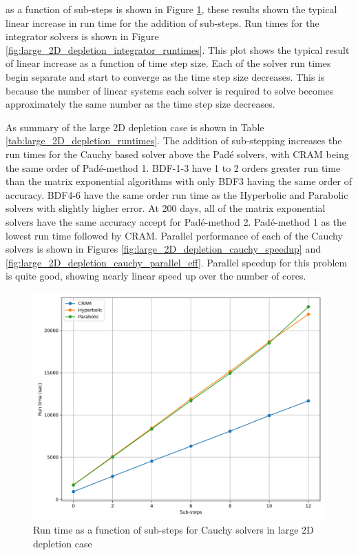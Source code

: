 \clearpage

\noindent as a function of sub-steps is shown in Figure \ref{fig:large_2D_depletion_Cauchy_runtimes}, these results shown the typical linear increase in run time for the addition of sub-steps. Run times for the integrator solvers is shown in Figure \ref{fig:large_2D_depletion_integrator_runtimes}. This plot shows the typical result of linear increase as a function of time step size. Each of the solver run times begin separate and start to converge as the time step size decreases. This is because the number of linear systems each solver is required to solve becomes approximately the same number as the time step size decreases. 

As summary of the large 2D depletion case is shown in Table \ref{tab:large_2D_depletion_runtimes}. The addition of sub-stepping increases the run times for the Cauchy based solver above the Pad\'e solvers, with CRAM being the same order of Pad\'e-method 1. BDF-1-3 have 1 to 2 orders greater run time than the matrix exponential algorithms with only BDF3 having the same order of accuracy. BDF4-6 have the same order run time as the Hyperbolic and Parabolic solvers with slightly higher error. At 200 days, all of the matrix exponential solvers have the same accuracy accept for Pad\'e-method 2. Pad\'e-method 1 as the lowest run time followed by CRAM. Parallel performance of each of the Cauchy solvers is shown in Figures \ref{fig:large_2D_depletion_cauchy_speedup} and \ref{fig:large_2D_depletion_cauchy_parallel_eff}. Parallel speedup for this problem is quite good, showing nearly linear speed up over the number of cores. 

\clearpage

\begin{figure}[p]
    \centering
    \includegraphics[width=5in]{images/chapter-5/caseStudies/large2DDepletion/msr2DDepletionLargeCauchyRuntimes.png}
    \caption{Run time as a function of sub-steps for Cauchy solvers in large 2D depletion case}
    \label{fig:large_2D_depletion_Cauchy_runtimes}
\end{figure}

